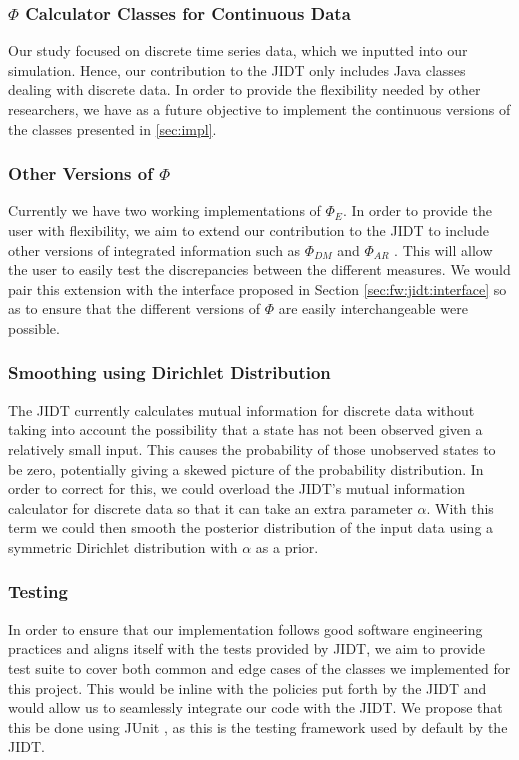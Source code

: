 \documentclass[a4paper,11pt]{article}
\begin{document}
\subsubsection{$\Phi$ Calculator Classes for Continuous Data}
\label{sec:fw:jidt:continuous}
Our study focused on discrete time series data, which we inputted into our simulation. Hence, our contribution to the JIDT only includes Java classes dealing with discrete data. In order to provide the flexibility needed by other researchers, we have as a future objective to implement the continuous versions of the classes presented in \ref{sec:impl}.


\subsubsection{Other Versions of $\Phi$}
\label{sec:fw:jidt:other-phi}
Currently we have two working implementations of $\Phi_{E}$. In order to provide the user with flexibility, we aim to extend our contribution to the JIDT to include other versions of integrated information such as $\Phi_{DM}$ and $\Phi_{AR}$ \cite{Barrett2011}. This will allow the user to easily test the discrepancies between the different measures. We would pair this extension with the interface proposed in Section \ref{sec:fw:jidt:interface} so as to ensure that the different versions of $\Phi$ are easily interchangeable were possible.

\subsubsection{Smoothing using Dirichlet Distribution}
\label{sec:fw:jidt:dirichlet}

The JIDT currently calculates mutual information for discrete data without taking into account the possibility that a state has not been observed given a relatively small input. This causes the probability of those unobserved states to be zero, potentially giving a skewed picture of the probability distribution. In order to correct for this, we could overload the JIDT's mutual information calculator for discrete data so that it can take an extra parameter $\alpha$. With this term we could then smooth the posterior distribution of the input data using a symmetric Dirichlet distribution with $\alpha$ as a prior.

\subsubsection{Testing}
\label{sec:fw:jidt:testing}
In order to ensure that our implementation follows good software engineering practices and aligns itself with the tests provided by JIDT, we aim to provide test suite to cover both common and edge cases of the classes we implemented for this project. This would be inline with the policies put forth by the JIDT and would allow us to seamlessly integrate our code with the JIDT. We propose that this be done using JUnit \cite{JUnit}, as this is the testing framework used by default by the JIDT.
\end{document}
